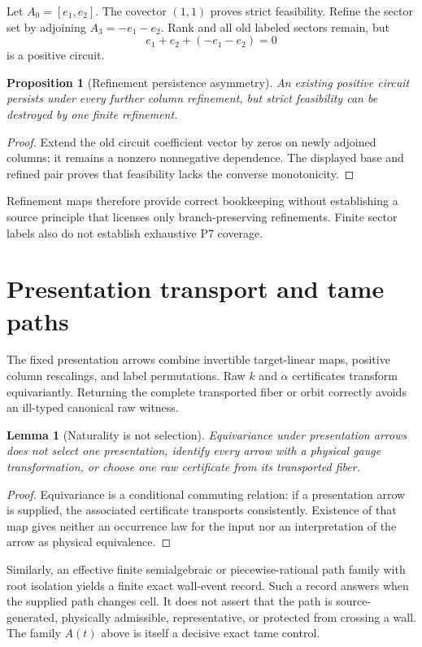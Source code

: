 \documentclass[11pt]{article}
\newtheorem{proposition}{Proposition}
\newtheorem{lemma}{Lemma}
\begin{document}
Let $A_0=[e_1,e_2]$.  The covector $(1,1)$ proves strict feasibility.  Refine
the sector set by adjoining $A_3=-e_1-e_2$.  Rank and all old labeled sectors
remain, but
\[
 e_1+e_2+(-e_1-e_2)=0
\]
is a positive circuit.

\begin{proposition}[Refinement persistence asymmetry]
An existing positive circuit persists under every further column refinement,
but strict feasibility can be destroyed by one finite refinement.
\end{proposition}

\begin{proof}
Extend the old circuit coefficient vector by zeros on newly adjoined columns;
it remains a nonzero nonnegative dependence.  The displayed base and refined
pair proves that feasibility lacks the converse monotonicity.
\end{proof}

Refinement maps therefore provide correct bookkeeping without establishing a
source principle that licenses only branch-preserving refinements.  Finite
sector labels also do not establish exhaustive P7 coverage.

\section{Presentation transport and tame paths}

The fixed presentation arrows combine invertible target-linear maps, positive
column rescalings, and label permutations.  Raw $k$ and $\alpha$ certificates
transform equivariantly.  Returning the complete transported fiber or orbit
correctly avoids an ill-typed canonical raw witness.

\begin{lemma}[Naturality is not selection]
Equivariance under presentation arrows does not select one presentation,
identify every arrow with a physical gauge transformation, or choose one raw
certificate from its transported fiber.
\end{lemma}

\begin{proof}
Equivariance is a conditional commuting relation: if a presentation arrow is
supplied, the associated certificate transports consistently.  Existence of
that map gives neither an occurrence law for the input nor an interpretation
of the arrow as physical equivalence.
\end{proof}

Similarly, an effective finite semialgebraic or piecewise-rational path family
with root isolation yields a finite exact wall-event record.  Such a record
answers when the supplied path changes cell.  It does not assert that the path
is source-generated, physically admissible, representative, or protected from
crossing a wall.  The family $A(t)$ above is itself a decisive exact tame
control.
\end{document}
